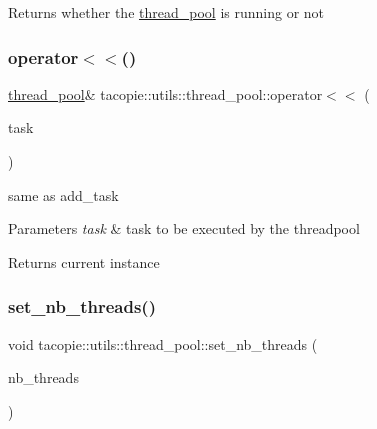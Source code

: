 \begin{DoxyReturn}{Returns}
whether the \hyperlink{classtacopie_1_1utils_1_1thread__pool}{thread\+\_\+pool} is running or not 
\end{DoxyReturn}
\mbox{\label{classtacopie_1_1utils_1_1thread__pool_afb7befd9fa5f1fbd44423fddc8cbc5d3}} 
\subsubsection{\texorpdfstring{operator$<$$<$()}{operator<<()}}
{\footnotesize\ttfamily \hyperlink{classtacopie_1_1utils_1_1thread__pool}{thread\+\_\+pool}\& tacopie\+::utils\+::thread\+\_\+pool\+::operator$<$$<$ (\begin{DoxyParamCaption}\item[{const \hyperlink{classtacopie_1_1utils_1_1thread__pool_a8ae8886fdeaa8e5c0abad12626a47296}{task\+\_\+t} \&}]{task }\end{DoxyParamCaption})}

same as add\+\_\+task


\begin{DoxyParams}{Parameters}
{\em task} & task to be executed by the threadpool \\
\hline
\end{DoxyParams}
\begin{DoxyReturn}{Returns}
current instance 
\end{DoxyReturn}
\mbox{\label{classtacopie_1_1utils_1_1thread__pool_a7c7ae922cedff8fa323828ebb6dea829}} 
\subsubsection{\texorpdfstring{set\+\_\+nb\+\_\+threads()}{set\_nb\_threads()}}
{\footnotesize\ttfamily void tacopie\+::utils\+::thread\+\_\+pool\+::set\+\_\+nb\+\_\+threads (\begin{DoxyParamCaption}\item[{std\+::size\+\_\+t}]{nb\+\_\+threads }\end{DoxyParamCaption})}

